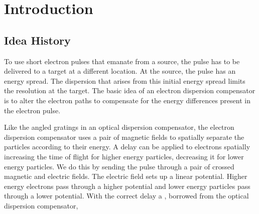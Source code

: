 \documentclass[12pt,letterpaper]{article}
\begin{document}
\section{Introduction}
\subsection{Idea History}

To use short electron pulses that emanate from a source, the pulse has to be delivered to a target at a different location. At the source, the pulse has an energy spread. The dispersion that arises from this initial energy spread limits the resolution at the target. The basic idea of an electron dispersion compensator is to alter the electron paths to compensate for the energy differences present in the electron pulse.

Like the angled gratings in an optical dispersion compensator, the electron dispersion compensator uses a pair of magnetic fields to spatially separate the particles according to their energy. A delay can be applied to electrons spatially increasing the time of flight for higher energy particles, decreasing it for lower energy particles. We do this by sending the pulse through a pair of crossed magnetic and electric fields. The electric field sets up a linear potential. Higher energy electrons pass through a higher potential and lower energy particles pass through a lower potential. With the correct delay a 
, borrowed from the optical dispersion compensator,
\end{document}
